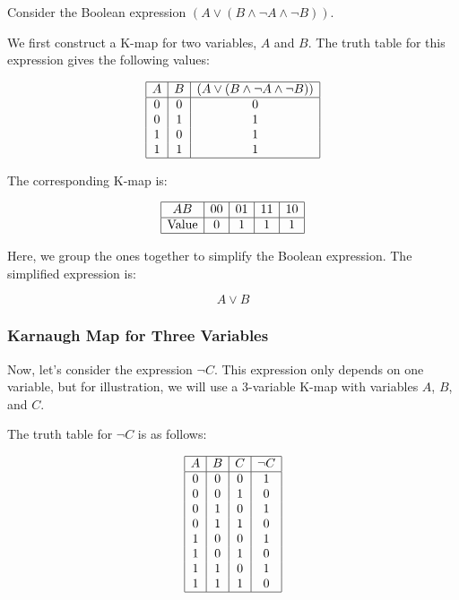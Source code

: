 Consider the Boolean expression \( (A \lor (B \land \neg A \land \neg B)) \).
\vspace{\baselineskip}

We first construct a K-map for two variables, \( A \) and \( B \). The truth table for this expression gives the following values:

\[
	\begin{array}{|c|c|c|}
		\hline
		A & B & (A \lor (B \land \neg A \land \neg B)) \\
		\hline
		0 & 0 & 0                                      \\
		0 & 1 & 1                                      \\
		1 & 0 & 1                                      \\
		1 & 1 & 1                                      \\
		\hline
	\end{array}
\]

The corresponding K-map is:

\[
	\begin{array}{|c|c|c|c|c|}
		\hline
		AB           & 00 & 01 & 11 & 10 \\
		\hline
		\text{Value} & 0  & 1  & 1  & 1  \\
		\hline
	\end{array}
\]

Here, we group the ones together to simplify the Boolean expression. The simplified expression is:

\[
	A \lor B
\]

\subsubsection{Karnaugh Map for Three Variables}

Now, let's consider the expression \( \neg C \). This expression only 
depends on one variable, but for illustration, we will use a 
3-variable K-map with variables \( A \), \( B \), and \( C \).
\vspace{\baselineskip}

The truth table for \( \neg C \) is as follows:

\[
	\begin{array}{|c|c|c|c|}
		\hline
		A & B & C & \neg C \\
		\hline
		0 & 0 & 0 & 1      \\
		0 & 0 & 1 & 0      \\
		0 & 1 & 0 & 1      \\
		0 & 1 & 1 & 0      \\
		1 & 0 & 0 & 1      \\
		1 & 0 & 1 & 0      \\
		1 & 1 & 0 & 1      \\
		1 & 1 & 1 & 0      \\
		\hline
	\end{array}
\]

